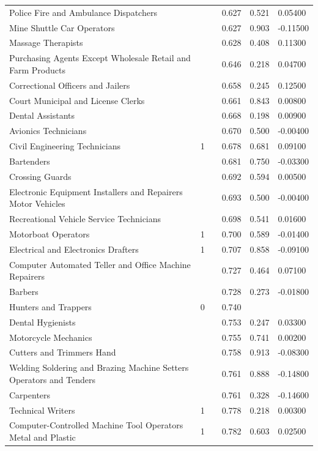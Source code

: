 \documentclass[11pt]{report}
\numberwithin{equation}{chapter}
\begin{document}
\begin{spacing}{2}
\begin{longtable}{ p{} p{} p{}  p{}  p{}  p{} }
Police Fire and Ambulance Dispatchers	&		&	&	0.627	&	0.521	&	0.05400	\\
Mine Shuttle Car Operators	&		&	&	0.627	&	0.903	&	-0.11500	\\
Massage Therapists	&		&	&	0.628	&	0.408	&	0.11300	\\
Purchasing Agents Except Wholesale Retail and Farm Products	&		&	&	0.646	&	0.218	&	0.04700	\\
Correctional Officers and Jailers	&		&	&	0.658	&	0.245	&	0.12500	\\
Court Municipal and License Clerks	&		&	&	0.661	&	0.843	&	0.00800	\\
Dental Assistants	&		&	&	0.668	&	0.198	&	0.00900	\\
Avionics Technicians	&		&	&	0.670	&	0.500	&	-0.00400	\\
Civil Engineering Technicians	&	1	&	&	0.678	&	0.681	&	0.09100	\\
Bartenders	&		&	&	0.681	&	0.750	&	-0.03300	\\
Crossing Guards	&		&	&	0.692	&	0.594	&	0.00500	\\
Electronic Equipment Installers and Repairers Motor Vehicles	&		&	&	0.693	&	0.500	&	-0.00400	\\
Recreational Vehicle Service Technicians	&		&	&	0.698	&	0.541	&	0.01600	\\
Motorboat Operators	&	1	&	&	0.700	&	0.589	&	-0.01400	\\
Electrical and Electronics Drafters	&	1	&	&	0.707	&	0.858	&	-0.09100	\\
Computer Automated Teller and Office Machine Repairers	&		&	&	0.727	&	0.464	&	0.07100	\\
Barbers	&		&	&	0.728	&	0.273	&	-0.01800	\\
Hunters and Trappers	&	0	&	&	0.740	&		&		\\
Dental Hygienists	&		&	&	0.753	&	0.247	&	0.03300	\\
Motorcycle Mechanics	&		&	&	0.755	&	0.741	&	0.00200	\\
Cutters and Trimmers Hand	&		&	&	0.758	&	0.913	&	-0.08300	\\
Welding Soldering and Brazing Machine Setters Operators and Tenders	&		&	&	0.761	&	0.888	&	-0.14800	\\
Carpenters	&		&	&	0.761	&	0.328	&	-0.14600	\\
Technical Writers	&	1	&	&	0.778	&	0.218	&	0.00300	\\
Computer-Controlled Machine Tool Operators Metal and Plastic	&	1	&	&	0.782	&	0.603	&	0.02500	\\

\end{longtable}
\end{spacing}
\end{document}
